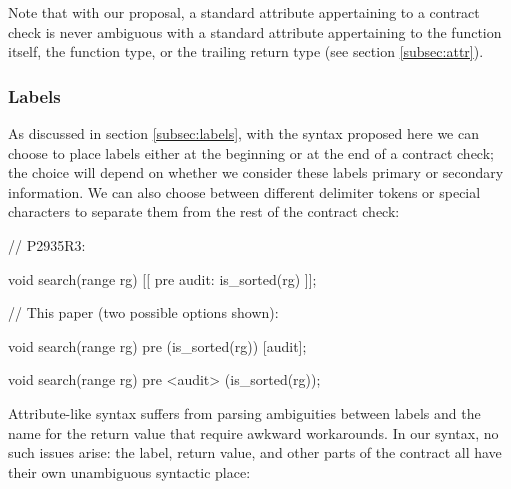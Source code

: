 Note that with our proposal, a standard attribute appertaining to a contract check is never ambiguous with a standard attribute appertaining to the function itself, the function type, or the trailing return type (see section \ref{subsec:attr}).

\subsubsection{Labels}

As discussed in section \ref{subsec:labels}, with the syntax proposed here we can choose to place labels either at the beginning or at the end of a contract check; the choice will depend on whether we consider these labels primary or secondary information. We can also choose between different delimiter tokens or special characters to separate them from the rest of the contract check:

\begin{minipage}[t]{8cm}
\begin{codeblock}
// P2935R3:

void search(range rg)
  [[ pre audit: is_sorted(rg) ]];
\end{codeblock}
\end{minipage}
\begin{minipage}[t]{8cm}
\begin{codeblock}
// This paper (two possible options shown):

void search(range rg)
  pre (is_sorted(rg)) [audit];
  
void search(range rg)
  pre <audit> (is_sorted(rg));
\end{codeblock}
\end{minipage}
\vspace{3mm}

Attribute-like syntax suffers from parsing ambiguities between labels and the name for the return value that require awkward workarounds. In our syntax, no such issues arise: the label, return value, and other parts of the contract all have their own unambiguous syntactic place:

